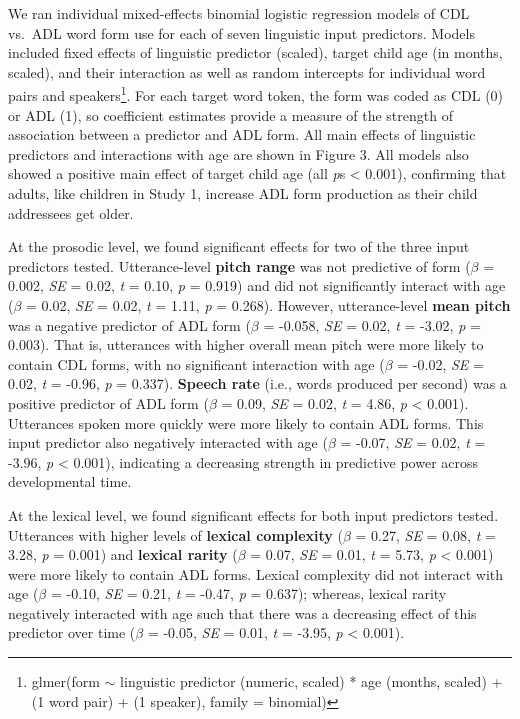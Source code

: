 \documentclass[10pt, letterpaper]{article}
\begin{document}
We ran individual mixed-effects binomial logistic regression models of
CDL vs.~ADL word form use for each of seven linguistic input predictors.
Models included fixed effects of linguistic predictor (scaled), target
child age (in months, scaled), and their interaction as well as random
intercepts for individual word pairs and speakers\footnote{glmer(form
  \(\sim\) linguistic predictor (numeric, scaled) * age (months, scaled)
  + (1 \textbar{} word pair) + (1 \textbar{} speaker), family =
  binomial)}. For each target word token, the form was coded as CDL (0)
or ADL (1), so coefficient estimates provide a measure of the strength
of association between a predictor and ADL form. All main effects of
linguistic predictors and interactions with age are shown in Figure 3.
All models also showed a positive main effect of target child age (all
\emph{p}s \textless{} 0.001), confirming that adults, like children in
Study 1, increase ADL form production as their child addressees get
older.

At the prosodic level, we found significant effects for two of the three
input predictors tested. Utterance-level \textbf{pitch range} was not
predictive of form (\(\beta\) = 0.002, \emph{SE} = 0.02, \emph{t} =
0.10, \emph{p} = 0.919) and did not significantly interact with age
(\(\beta\) = 0.02, \emph{SE} = 0.02, \emph{t} = 1.11, \emph{p} = 0.268).
However, utterance-level \textbf{mean pitch} was a negative predictor of
ADL form (\(\beta\) = -0.058, \emph{SE} = 0.02, \emph{t} = -3.02,
\emph{p} = 0.003). That is, utterances with higher overall mean pitch
were more likely to contain CDL forms, with no significant interaction
with age (\(\beta\) = -0.02, \emph{SE} = 0.02, \emph{t} = -0.96,
\emph{p} = 0.337). \textbf{Speech rate} (i.e., words produced per
second) was a positive predictor of ADL form (\(\beta\) = 0.09,
\emph{SE} = 0.02, \emph{t} = 4.86, \emph{p} \textless{} 0.001).
Utterances spoken more quickly were more likely to contain ADL forms.
This input predictor also negatively interacted with age (\(\beta\) =
-0.07, \emph{SE} = 0.02, \emph{t} = -3.96, \emph{p} \textless{} 0.001),
indicating a decreasing strength in predictive power across
developmental time.

At the lexical level, we found significant effects for both input
predictors tested. Utterances with higher levels of \textbf{lexical
complexity} (\(\beta\) = 0.27, \emph{SE} = 0.08, \emph{t} = 3.28,
\emph{p} = 0.001) and \textbf{lexical rarity} (\(\beta\) = 0.07,
\emph{SE} = 0.01, \emph{t} = 5.73, \emph{p} \textless{} 0.001) were more
likely to contain ADL forms. Lexical complexity did not interact with
age (\(\beta\) = -0.10, \emph{SE} = 0.21, \emph{t} = -0.47, \emph{p} =
0.637); whereas, lexical rarity negatively interacted with age such that
there was a decreasing effect of this predictor over time (\(\beta\) =
-0.05, \emph{SE} = 0.01, \emph{t} = -3.95, \emph{p} \textless{} 0.001).
\end{document}
